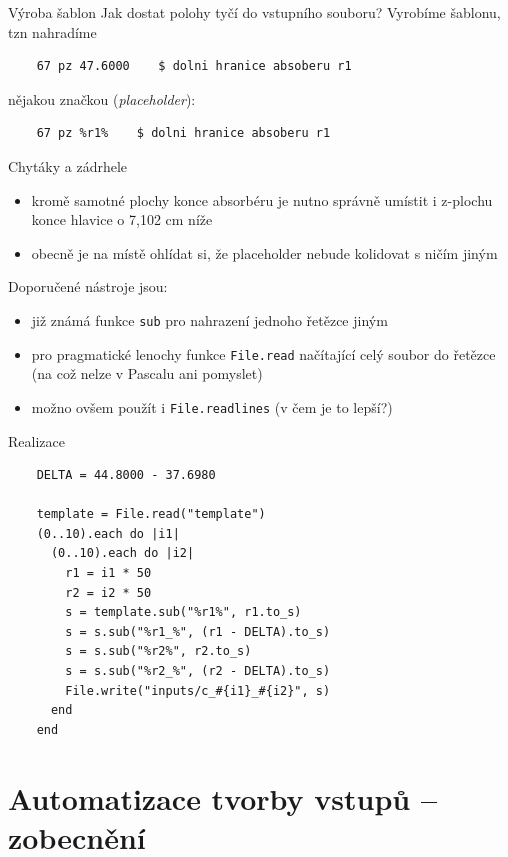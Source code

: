 \documentclass{beamer}
\begin{document}
\begin{frame}[fragile]{Výroba šablon}
  Jak dostat polohy tyčí do vstupního souboru? Vyrobíme šablonu, tzn nahradíme
  \begin{verbatim}
    67 pz 47.6000    $ dolni hranice absoberu r1
  \end{verbatim}
  \pause
  nějakou značkou (\emph{placeholder}):
  \begin{verbatim}
    67 pz %r1%    $ dolni hranice absoberu r1
  \end{verbatim}
\end{frame}

\begin{frame}{Chytáky a zádrhele}
  \begin{itemize}
    \item kromě samotné plochy konce absorbéru je nutno správně umístit i z-plochu konce hlavice o 7,102 cm níže
    \item obecně je na místě ohlídat si, že placeholder nebude kolidovat s ničím jiným
  \end{itemize}
  Doporučené nástroje jsou:
  \begin{itemize}
    \item již známá funkce \texttt{sub} pro nahrazení jednoho řetězce jiným
    \item pro pragmatické lenochy funkce \texttt{File.read} načítající celý soubor do řetězce (na což nelze v Pascalu ani pomyslet)
    \item možno ovšem použít i \texttt{File.readlines} (v čem je to lepší?)
  \end{itemize}
\end{frame}

\begin{frame}[fragile]{Realizace}
  \scriptsize
  \begin{verbatim}
    DELTA = 44.8000 - 37.6980

    template = File.read("template")
    (0..10).each do |i1|
      (0..10).each do |i2|
        r1 = i1 * 50
        r2 = i2 * 50
        s = template.sub("%r1%", r1.to_s)
        s = s.sub("%r1_%", (r1 - DELTA).to_s)
        s = s.sub("%r2%", r2.to_s)
        s = s.sub("%r2_%", (r2 - DELTA).to_s)
        File.write("inputs/c_#{i1}_#{i2}", s)
      end
    end
  \end{verbatim}
\end{frame}

\section{Automatizace tvorby vstupů -- zobecnění}
\end{document}
